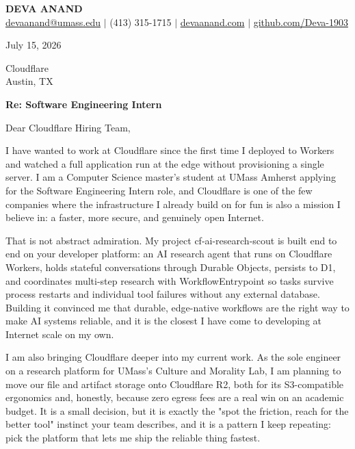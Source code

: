 \documentclass[letterpaper,11pt]{article}
\begin{document}
\begin{center}
    {\fontsize{18}{20}\selectfont\bfseries DEVA ANAND}\\ \vspace{3pt}
    {\small
    \href{mailto:devaanand@umass.edu}{devaanand@umass.edu}
    \enspace$\vert$\enspace
    (413) 315-1715
    \enspace$\vert$\enspace
    \href{https://devaanand.com}{devaanand.com}
    \enspace$\vert$\enspace
    \href{https://github.com/Deva-1903}{github.com/Deva-1903}}
\end{center}
\vspace{6pt}

\noindent July 15, 2026

\vspace{2pt}

\noindent Cloudflare\\
Austin, TX

\vspace{2pt}

\noindent \textbf{Re: Software Engineering Intern}

\vspace{4pt}

\noindent Dear Cloudflare Hiring Team,

I have wanted to work at Cloudflare since the first time I deployed to Workers and watched a full application run at the edge without provisioning a single server. I am a Computer Science master's student at UMass Amherst applying for the Software Engineering Intern role, and Cloudflare is one of the few companies where the infrastructure I already build on for fun is also a mission I believe in: a faster, more secure, and genuinely open Internet.

That is not abstract admiration. My project cf-ai-research-scout is built end to end on your developer platform: an AI research agent that runs on Cloudflare Workers, holds stateful conversations through Durable Objects, persists to D1, and coordinates multi-step research with WorkflowEntrypoint so tasks survive process restarts and individual tool failures without any external database. Building it convinced me that durable, edge-native workflows are the right way to make AI systems reliable, and it is the closest I have come to developing at Internet scale on my own.

I am also bringing Cloudflare deeper into my current work. As the sole engineer on a research platform for UMass's Culture and Morality Lab, I am planning to move our file and artifact storage onto Cloudflare R2, both for its S3-compatible ergonomics and, honestly, because zero egress fees are a real win on an academic budget. It is a small decision, but it is exactly the "spot the friction, reach for the better tool" instinct your team describes, and it is a pattern I keep repeating: pick the platform that lets me ship the reliable thing fastest.
\end{document}
